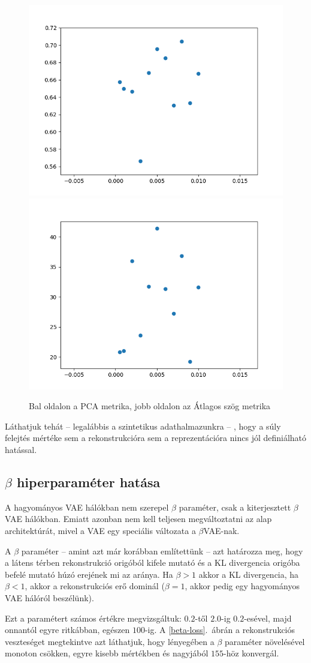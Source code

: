 \begin{figure}[h!]
  
  \includegraphics[width=0.5\linewidth]{vae_wd-pca.png}
  \includegraphics[width=0.5\linewidth]{vae_wd-as.png}
  \caption{Bal oldalon a PCA metrika, jobb oldalon az Átlagos szög metrika}\label{wd-metrics}
\end{figure}

Láthatjuk tehát -- legalábbis a szintetikus adathalmazunkra -- , hogy a súly felejtés mértéke sem a rekonstrukcióra sem a reprezentációra nincs jól definiálható hatással.

\subsection{$\beta$ hiperparaméter hatása}

A hagyományos VAE hálókban nem szerepel $\beta$ paraméter, csak a kiterjesztett $\beta$VAE hálókban. Emiatt azonban nem kell teljesen megváltoztatni az alap architektúrát, mivel a VAE egy speciális változata a $\beta$VAE-nak.

A $\beta$ paraméter -- amint azt már korábban említettünk -- azt határozza meg, hogy a látens térben rekonstrukció origóból kifele mutató és a KL divergencia origóba befelé mutató húzó erejének mi az aránya. Ha $\beta>1$ akkor a KL divergencia, ha $\beta<1$, akkor a rekonstrukciós erő dominál ($\beta=1$, akkor pedig egy hagyományos VAE hálóról beszélünk).

Ezt a paramétert számos értékre megvizsgáltuk: $0.2$-től $2.0$-ig $0.2$-esével, majd onnantól egyre ritkábban, egészen $100$-ig. A \ref{beta-loss}.~ábrán a rekonstrukciós veszteséget megtekintve azt láthatjuk, hogy lényegében a $\beta$ paraméter növelésével monoton csökken, egyre kisebb mértékben és nagyjából $155$-höz konvergál. 

